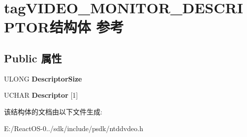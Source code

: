 \hypertarget{structtag_v_i_d_e_o___m_o_n_i_t_o_r___d_e_s_c_r_i_p_t_o_r}{}\section{tag\+V\+I\+D\+E\+O\+\_\+\+M\+O\+N\+I\+T\+O\+R\+\_\+\+D\+E\+S\+C\+R\+I\+P\+T\+O\+R结构体 参考}
\label{structtag_v_i_d_e_o___m_o_n_i_t_o_r___d_e_s_c_r_i_p_t_o_r}
\subsection*{Public 属性}
\begin{DoxyCompactItemize}
\item 
\mbox{\label{structtag_v_i_d_e_o___m_o_n_i_t_o_r___d_e_s_c_r_i_p_t_o_r_a7c5f56db6298bfc4c45f67f3282f856b}} 
U\+L\+O\+NG {\bfseries Descriptor\+Size}
\item 
\mbox{\label{structtag_v_i_d_e_o___m_o_n_i_t_o_r___d_e_s_c_r_i_p_t_o_r_a82aea10c6dbc869137b3d31a8a213f6a}} 
U\+C\+H\+AR {\bfseries Descriptor} \mbox{[}1\mbox{]}
\end{DoxyCompactItemize}


该结构体的文档由以下文件生成\+:\begin{DoxyCompactItemize}
\item 
E\+:/\+React\+O\+S-\/0../sdk/include/psdk/ntddvdeo.\+h\end{DoxyCompactItemize}
